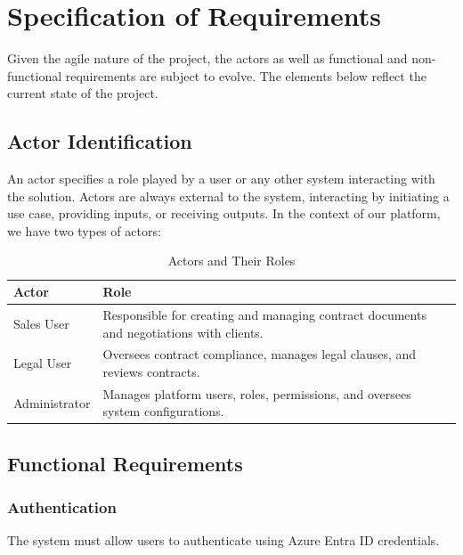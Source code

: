 \section{Specification of Requirements}
Given the agile nature of the project, the actors as well as functional and non-functional requirements are subject to evolve. The elements below reflect the current state of the project.

\subsection{Actor Identification}
An actor specifies a role played by a user or any other system interacting with the solution. Actors are always external to the system, interacting by initiating a use case, providing inputs, or receiving outputs. In the context of our platform, we have two types of actors:

\begin{table}[ht!]
    \centering
    \small
    \begin{tabularx}{\textwidth}{|l|X|}
        \hline
        \textbf{Actor} & \textbf{Role} \\
        \hline
        Sales User & Responsible for creating and managing contract documents and negotiations with clients. \\
        Legal User & Oversees contract compliance, manages legal clauses, and reviews contracts. \\
        Administrator & Manages platform users, roles, permissions, and oversees system configurations. \\
        \hline
    \end{tabularx}
    \caption{Actors and Their Roles}
    \label{tab:actorsWithRoles}
\end{table}

\subsection{Functional Requirements}

\subsubsection{Authentication}
The system must allow users to authenticate using Azure Entra ID credentials.

